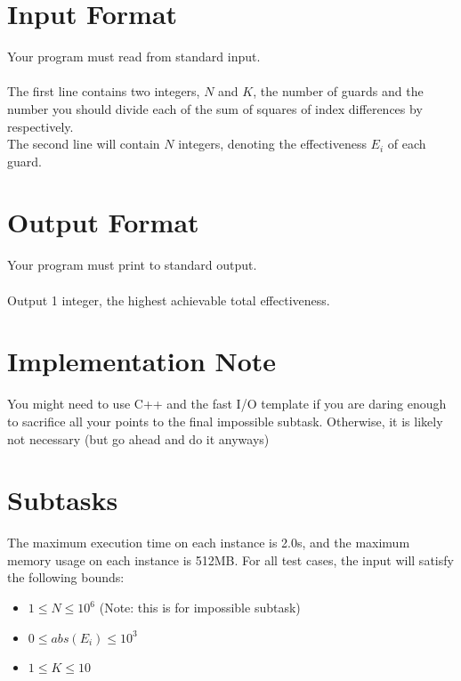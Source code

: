 \documentclass{report}
\begin{document}
\section*{Input Format}
Your program must read from standard input.
\\\\
The first line contains two integers, $N$ and $K$, the number of guards and the number you should divide each of the sum of squares of index differences by respectively.
\\
The second line will contain $N$ integers, denoting the effectiveness $E_i$ of each guard.

\section*{Output Format}
Your program must print to standard output.
\\\\
Output 1 integer, the highest achievable total effectiveness.

\section*{Implementation Note}
You might need to use C++ and the fast I/O template if you are daring enough to sacrifice all your points to the final impossible subtask. Otherwise, it is likely not necessary (but go ahead and do it anyways)

    \section*{Subtasks}
The maximum execution time on each instance is 2.0s, and the maximum memory usage on each instance is 512MB. For all test cases, the input will satisfy the following bounds:

\begin{itemize}
    \item $1 \leq N \leq 10^6$ (Note: this is for impossible subtask)
    \item $0 \leq abs(E_i) \leq 10^3$
    \item $1 \leq K \leq 10$
\end{itemize}
\end{document}
